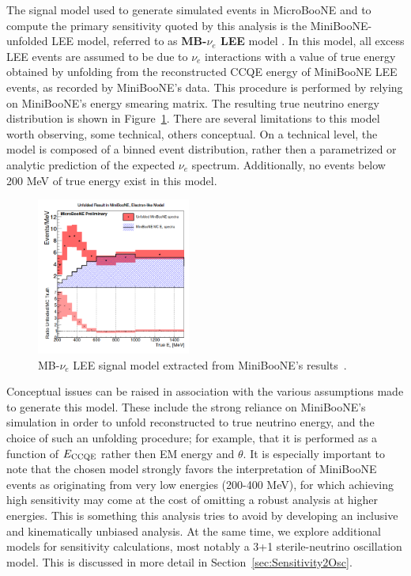 \par  The signal model used to generate simulated events in MicroBooNE and to compute the primary sensitivity quoted by this analysis  is the MiniBooNE-unfolded LEE model, referred to as \textbf{MB-$\nu_e$ LEE} model \cite{C2,C}. In this model, all excess LEE events are assumed to be due to $\nu_e$ interactions with a value of true energy obtained by unfolding from the reconstructed CCQE energy of MiniBooNE LEE events, as recorded by MiniBooNE's data. This procedure is performed by relying on MiniBooNE's energy smearing matrix. The resulting true neutrino energy distribution is shown in Figure~\ref{fig:minibooneunfolded}. There are several limitations to this model worth observing, some technical, others conceptual. On a technical level, the model is composed of a binned event distribution, rather then a parametrized or analytic prediction of the expected $\nu_e$ spectrum. Additionally, no events below 200 MeV of true energy exist in this model. 
\begin{figure}[ht]
\begin{center}
\includegraphics[width=0.45\textwidth]{introduction/unfoldedminiboone.png}
\caption{\label{fig:minibooneunfolded}MB-$\nu_e$ LEE signal model extracted from MiniBooNE's results~\cite{C2}.}
\end{center}
\end{figure}
Conceptual issues can be raised in association with the various assumptions made to generate this model. These include the strong reliance on MiniBooNE's simulation in order to unfold reconstructed to true neutrino energy, and the choice of such an unfolding procedure; for example, that it is performed as a function of $E_{\rm CCQE}$ rather then EM energy and $\theta$.
It is especially important to note that the chosen model strongly favors the interpretation of MiniBooNE events as originating from very low energies (200-400 MeV), for which achieving high sensitivity may come at the cost of omitting a robust analysis at higher energies. This is something this analysis tries to avoid by developing an inclusive and kinematically unbiased analysis. At the same time, we explore additional models for sensitivity calculations, most notably a 3+1 sterile-neutrino oscillation model. This is discussed in more detail in Section~\ref{sec:Sensitivity2Osc}.
